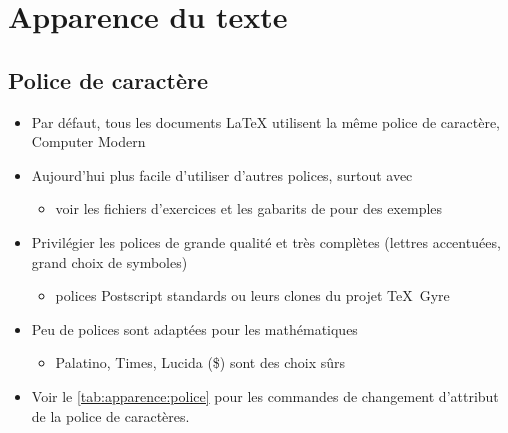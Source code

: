 \section{Apparence du texte}

\subsection{Police de caractère}

\begin{itemize}
\item Par défaut, tous les documents {\LaTeX} utilisent la même police
  de caractère, {\selectfont Computer Modern}
\item Aujourd'hui plus facile d'utiliser d'autres polices, surtout
  avec {\XeLaTeX}
  \begin{itemize}
  \item voir les fichiers d'exercices et les gabarits de
     pour des exemples
  \end{itemize}
\item Privilégier les polices de grande qualité et très complètes
  (lettres accentuées, grand choix de symboles)
  \begin{itemize}
  \item polices Postscript standards ou leurs clones du projet
    TeX~Gyre
  \end{itemize}
\item Peu de polices sont adaptées pour les mathématiques
  \begin{itemize}
  \item {\selectfont Palatino},
    {\selectfont Times}, \textrm{Lucida} (\$) sont des
    choix sûrs
  \end{itemize}
\item Voir le \autoref{tab:apparence:police} pour les commandes de
  changement d'attribut de la police de caractères.
\end{itemize}

